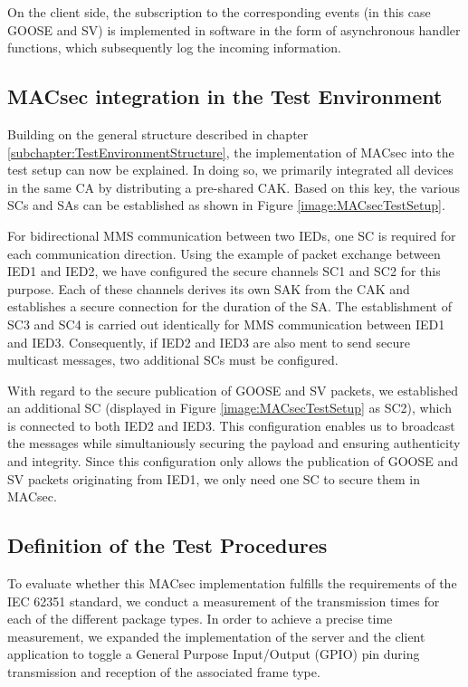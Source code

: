 \documentclass[conference, onecolumn, a4paper]{IEEEtran}
\begin{document}
\smallskip 
On the client side, the subscription to the corresponding events (in this case GOOSE and SV) is implemented in software in the form of asynchronous 
handler functions, which subsequently log the incoming information. 

\subsection{MACsec integration in the Test Environment}
\label{subchapter:TestEnvironmentMACsec}
\noindent Building on the general structure described in chapter \ref{subchapter:TestEnvironmentStructure}, the implementation of MACsec into the test 
setup can now be explained. In doing so, we primarily integrated all devices in the same CA by distributing a pre-shared CAK. Based on this key, the 
various SCs and SAs can be established as shown in Figure \ref{image:MACsecTestSetup}.

\smallskip
For bidirectional MMS communication between two IEDs, one SC is required for each communication direction. Using the example of packet exchange between 
IED1 and IED2, we have configured the secure channels SC1 and SC2 for this purpose. Each of these channels derives its own SAK from the CAK and 
establishes a secure connection for the duration of the SA. The establishment of SC3 and SC4 is carried out identically for MMS communication between 
IED1 and IED3. Consequently, if IED2 and IED3 are also ment to send secure multicast messages, two additional SCs must be configured.

\smallskip
With regard to the secure publication of GOOSE and SV packets, we established an additional SC (displayed in Figure \ref{image:MACsecTestSetup} as SC2), 
which is connected to both IED2 and IED3. This configuration enables us to broadcast the messages while simultaniously securing the payload and ensuring 
authenticity and integrity. Since this configuration only allows the publication of GOOSE and SV packets originating from IED1, we only need one SC 
to secure them in MACsec.   

\subsection{Definition of the Test Procedures}
\label{subchapter:TestProcedures}
\noindent To evaluate whether this MACsec implementation fulfills the requirements of the IEC 62351 standard, we conduct a measurement of the 
transmission times for each of the different package types. In order to achieve a precise time measurement, we expanded the implementation of the server 
and the client application to toggle a General Purpose Input/Output (GPIO) pin during transmission and reception of the associated frame type. 
\end{document}
